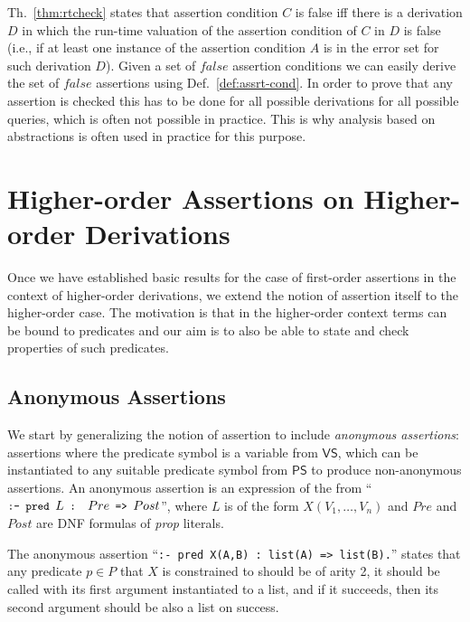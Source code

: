 \documentclass{llncs}
\newcommand{\VS}{\textsf{VS}}
\newcommand{\PS}{\textsf{PS}}
\newcommand{\skbd}[1]{\mbox{\tt\small{#1}}}
\begin{document}
Th.~\ref{thm:rtcheck} states that assertion condition $C$ is false iff
there is a derivation $D$ in which the run-time valuation of the
assertion condition of $C$ in $D$ is false (i.e., if at least one
instance of the assertion condition $A$ is in the error set for such
derivation $D$).
Given a set of $false$ assertion conditions we can easily derive the set
of $false$ assertions using Def.~\ref{def:assrt-cond}. 
In order to prove that any assertion is checked this has to be
done for all possible derivations for all possible queries, which is
often not possible in practice. This is why analysis based on
abstractions is often used in practice for this purpose.



\section{Higher-order Assertions on Higher-order Derivations}
\label{sec:ho-ho}

Once we have established basic results for the case of first-order
assertions in the context of higher-order derivations, we extend the
notion of assertion itself to the higher-order case.  The motivation
is that in the higher-order context terms can be bound to predicates
and our aim is to also be able to state and check properties of such
predicates.



\subsection{Anonymous Assertions}

We start by generalizing the notion of assertion to include
\emph{anonymous assertions}: assertions where the predicate symbol is
a variable from $\VS$, which can be instantiated to any suitable
predicate symbol from $\PS$ to produce non-anonymous assertions. 
An anonymous assertion is an expression of the from 
``$\skbd{:- pred } L \skbd{ : } Pre \skbd{ => }Post$'', where $L$
is of the form $X(V_1, \ldots,V_n)$ and $Pre$ and $Post$ are
DNF formulas of \emph{prop} literals.

\begin{example}
  The anonymous assertion 
  ``\skbd{:- pred X(A,B) : list(A) => list(B).}''
  states that any predicate $p \in P$ that $X$ is constrained to
  should be of arity 2, it should be called with its first argument
  instantiated to a list, and if it succeeds, then its second argument
  should be also a list on success.
\end{example}
\end{document}
